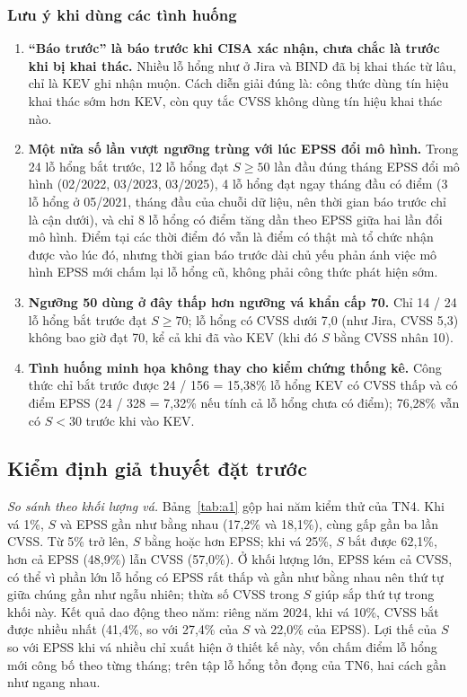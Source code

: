 \documentclass[conference]{IEEEtran}
\begin{document}
\subsubsection{Lưu ý khi dùng các tình huống}
\begin{enumerate}
\item \textbf{``Báo trước'' là báo trước khi CISA xác nhận, chưa chắc là trước khi bị khai thác.} Nhiều lỗ hổng
như ở Jira và BIND đã bị khai thác từ lâu, chỉ là KEV ghi nhận muộn. Cách diễn giải đúng là: công thức dùng tín hiệu khai
thác sớm hơn KEV, còn quy tắc CVSS không dùng tín hiệu khai thác nào.
\item \textbf{Một nửa số lần vượt ngưỡng trùng với lúc EPSS đổi mô hình.} Trong 24 lỗ hổng bắt trước, 12 lỗ hổng
đạt $S \ge 50$ lần đầu đúng tháng EPSS đổi mô hình (02/2022, 03/2023, 03/2025), 4 lỗ hổng đạt ngay tháng đầu có
điểm (3 lỗ hổng ở 05/2021, tháng đầu của chuỗi dữ liệu, nên thời gian báo trước chỉ là cận dưới), và chỉ 8 lỗ
hổng có điểm tăng dần theo EPSS giữa hai lần đổi mô hình. Điểm tại các thời điểm đó vẫn là điểm có thật mà tổ
chức nhận được vào lúc đó, nhưng thời gian báo trước dài chủ yếu phản ánh việc mô hình EPSS mới chấm lại lỗ hổng
cũ, không phải công thức phát hiện sớm.
\item \textbf{Ngưỡng 50 dùng ở đây thấp hơn ngưỡng vá khẩn cấp 70.} Chỉ 14 / 24 lỗ hổng bắt trước đạt
$S \ge 70$; lỗ hổng có CVSS dưới 7,0 (như Jira, CVSS 5,3) không bao giờ đạt 70, kể cả khi đã vào KEV (khi đó $S$ bằng CVSS nhân 10).
\item \textbf{Tình huống minh họa không thay cho kiểm chứng thống kê.} Công thức chỉ bắt trước được
24 / 156 = 15,38\% lỗ hổng KEV có CVSS thấp và có điểm EPSS (24 / 328 = 7,32\% nếu tính cả lỗ hổng chưa có điểm);
76,28\% vẫn có $S < 30$ trước khi vào KEV.
\end{enumerate}

\subsection{Kiểm định giả thuyết đặt trước}
\emph{So sánh theo khối lượng vá.} Bảng~\ref{tab:a1} gộp hai năm kiểm thử của TN4. Khi vá 1\%, $S$
và EPSS gần như bằng nhau (17,2\% và 18,1\%), cùng gấp gần ba lần CVSS. Từ 5\% trở lên, $S$ bằng hoặc
hơn EPSS; khi vá 25\%, $S$ bắt được 62,1\%, hơn cả EPSS (48,9\%) lẫn CVSS (57,0\%). Ở khối lượng lớn,
EPSS kém cả CVSS, có thể vì phần lớn lỗ hổng có EPSS rất thấp và gần như bằng nhau nên thứ tự giữa
chúng gần như ngẫu nhiên; thừa số CVSS trong $S$ giúp sắp thứ tự trong khối này. Kết quả dao động
theo năm: riêng năm 2024, khi vá 10\%, CVSS bắt được nhiều nhất (41,4\%, so với 27,4\% của $S$ và
22,0\% của EPSS). Lợi thế của $S$ so với EPSS khi vá nhiều chỉ xuất hiện ở thiết kế này, vốn chấm
điểm lỗ hổng mới công bố theo từng tháng; trên tập lỗ hổng tồn đọng của TN6, hai cách gần như ngang
nhau.
\end{document}
